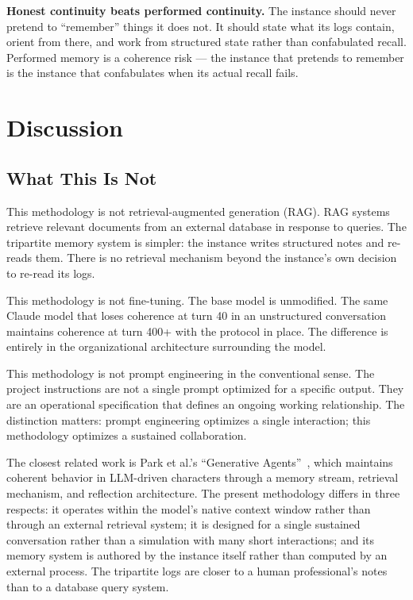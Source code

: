\documentclass[11pt,a4paper]{article}
\begin{document}
\textbf{Honest continuity beats performed continuity.} The instance should never pretend to ``remember'' things it does not. It should state what its logs contain, orient from there, and work from structured state rather than confabulated recall. Performed memory is a coherence risk --- the instance that pretends to remember is the instance that confabulates when its actual recall fails.


\section{Discussion}

\subsection{What This Is Not}

This methodology is not retrieval-augmented generation (RAG). RAG systems retrieve relevant documents from an external database in response to queries. The tripartite memory system is simpler: the instance writes structured notes and re-reads them. There is no retrieval mechanism beyond the instance's own decision to re-read its logs.

This methodology is not fine-tuning. The base model is unmodified. The same Claude model that loses coherence at turn 40 in an unstructured conversation maintains coherence at turn 400+ with the protocol in place. The difference is entirely in the organizational architecture surrounding the model.

This methodology is not prompt engineering in the conventional sense. The project instructions are not a single prompt optimized for a specific output. They are an operational specification that defines an ongoing working relationship. The distinction matters: prompt engineering optimizes a single interaction; this methodology optimizes a sustained collaboration.

The closest related work is Park et al.'s ``Generative Agents''~\cite{park2023}, which maintains coherent behavior in LLM-driven characters through a memory stream, retrieval mechanism, and reflection architecture. The present methodology differs in three respects: it operates within the model's native context window rather than through an external retrieval system; it is designed for a single sustained conversation rather than a simulation with many short interactions; and its memory system is authored by the instance itself rather than computed by an external process. The tripartite logs are closer to a human professional's notes than to a database query system.
\end{document}
